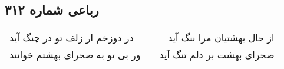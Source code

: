 \begin{center}
\section*{رباعی شماره ۳۱۲}
\label{sec:sh312}
\begin{longtable}{l p{0.5cm} r}
در دوزخم ار زلف تو در چنگ آید
&&
از حال بهشتیان مرا ننگ آید
\\
ور بی تو به صحرای بهشتم خوانند
&&
صحرای بهشت بر دلم تنگ آید
\\
\end{longtable}
\end{center}
